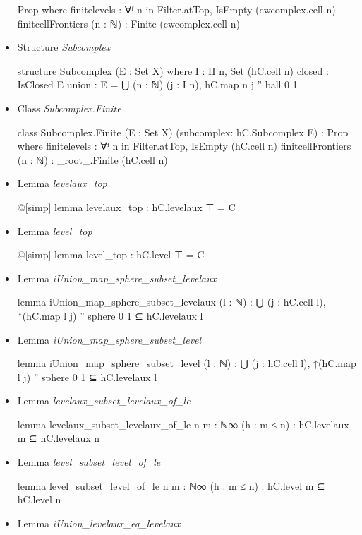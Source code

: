 \documentclass[colorinlistoftodos]{article}
\begin{document}
\begin{itemize}
\begin{leancode}
Prop where
  finitelevels : ∀ᶠ n in Filter.atTop, IsEmpty (cwcomplex.cell n)
  finitcellFrontiers (n : ℕ) : Finite (cwcomplex.cell n)
\end{leancode}
  \item Structure \emph{Subcomplex}
\begin{leancode}
structure Subcomplex (E : Set X) where
  I : Π n, Set (hC.cell n)
  closed : IsClosed E
  union : E = ⋃ (n : ℕ) (j : I n), hC.map n j '' ball 0 1
\end{leancode}
  \item Class \emph{Subcomplex.Finite}
\begin{leancode}
class Subcomplex.Finite (E : Set X) (subcomplex: hC.Subcomplex E) : Prop where
  finitelevels : ∀ᶠ n in Filter.atTop, IsEmpty (hC.cell n)
  finitcellFrontiers (n : ℕ) : _root_.Finite (hC.cell n)
\end{leancode}
  \item Lemma \emph{levelaux\_top}
\begin{leancode}
@[simp] lemma levelaux_top : hC.levelaux ⊤ = C
\end{leancode}
  \item Lemma \emph{level\_top}
\begin{leancode}
@[simp] lemma level_top : hC.level ⊤ = C
\end{leancode}
  \item Lemma \emph{iUnion\_map\_sphere\_subset\_levelaux}
\begin{leancode}
lemma iUnion_map_sphere_subset_levelaux (l : ℕ) :
  ⋃ (j : hC.cell l), ↑(hC.map l j) '' sphere 0 1 ⊆ hC.levelaux l
\end{leancode}
  \item Lemma \emph{iUnion\_map\_sphere\_subset\_level}
\begin{leancode}
lemma iUnion_map_sphere_subset_level (l : ℕ) :
  ⋃ (j : hC.cell l), ↑(hC.map l j) '' sphere 0 1 ⊆ hC.levelaux l
\end{leancode}
  \item Lemma \emph{levelaux\_subset\_levelaux\_of\_le}
\begin{leancode}
lemma levelaux_subset_levelaux_of_le {n m : ℕ∞} (h : m ≤ n) :
  hC.levelaux m ⊆ hC.levelaux n
\end{leancode}
  \item Lemma \emph{level\_subset\_level\_of\_le}
\begin{leancode}
lemma level_subset_level_of_le {n m : ℕ∞} (h : m ≤ n) : hC.level m ⊆ hC.level n
\end{leancode}
  \item Lemma \emph{iUnion\_levelaux\_eq\_levelaux}

\end{itemize}
\end{document}
